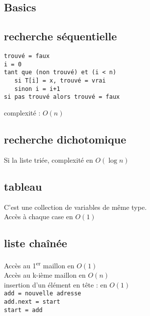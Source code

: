 \documentclass[8pt,a4paper]{extarticle}
\begin{document}
\begin{multicols}{3}

      \section{Basics}

      \subsection{recherche séquentielle}

      \begin{mdframed}
            \verb|trouvé = faux|\\
            \verb|i = 0|\\
            \verb|tant que (non trouvé) et (i < n)|\\
            \verb|   si T[i] = x, trouvé = vrai|\\
            \verb|   sinon i = i+1|\\
            \verb|si pas trouvé alors trouvé = faux|\\
      \end{mdframed}

      complexité : \(O(n)\)

      \bigskip

      \subsection{recherche dichotomique}
      Si la liste triée, complexité en \(O(\log n)\)


      \subsection{tableau}
      C'est une collection de variables de même type.\\
      Accès à chaque case en \(O(1)\)

      \subsection{liste chaînée}
      Accès au 1\textsuperscript{er} maillon en \(O(1)\)\\
      Accès au k-ième maillon en \(O(n)\)\\
      insertion d'un élément en tête : en \(O(1)\)\\
      \verb|add = nouvelle adresse|\\
      \verb|add.next = start|\\
      \verb|start = add|



\end{multicols}
\end{document}
